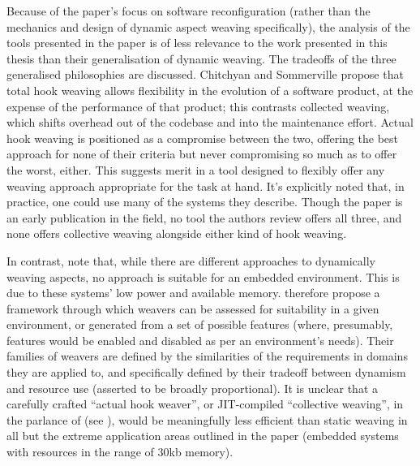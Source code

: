 Because of the paper's focus on software reconfiguration (rather than the
mechanics and design of dynamic aspect weaving specifically), the analysis of
the tools presented in the paper is of less relevance to the work presented in
this thesis than their generalisation of dynamic weaving. The tradeoffs of the
three generalised philosophies are discussed. Chitchyan and Sommerville propose
that total hook weaving allows flexibility in the evolution of a software
product, at the expense of the performance of that product; this contrasts
collected weaving, which shifts overhead out of the codebase and into the
maintenance effort. Actual hook weaving is positioned as a compromise between
the two, offering the best approach for none of their criteria but never
compromising so much as to offer the worst, either. This suggests merit in a
tool designed to flexibly offer any weaving approach appropriate for the task at
hand. It's explicitly noted that, in practice, one could use many of the systems
they describe. Though the paper is an early publication in the field, no tool
the authors review offers all three, and none offers collective weaving
alongside either kind of hook weaving.


In contrast, \citeauthor{gilani2004family} note that, while there are different
approaches to dynamically weaving aspects, no approach is suitable for an
embedded environment. This is due to these systems' low power and available
memory. \citeauthor{gilani2004family} therefore propose a framework through
which weavers can be assessed for suitability in a given environment, or
generated from a set of possible features (where, presumably, features would be
enabled and disabled as per an environment's needs). Their families of weavers
are defined by the similarities of the requirements in domains they are applied
to, and specifically defined by their tradeoff between dynamism and resource use
(asserted to be broadly proportional). It is unclear that a carefully crafted
``actual hook weaver'', or JIT-compiled ``collective weaving'', in the parlance
of \citeauthor{dynamicAOchitchyan} (see \citep{dynamicAOchitchyan}), would be
meaningfully less efficient than static weaving in all but the extreme
application areas outlined in the paper (embedded systems with resources in the
range of 30kb memory).

